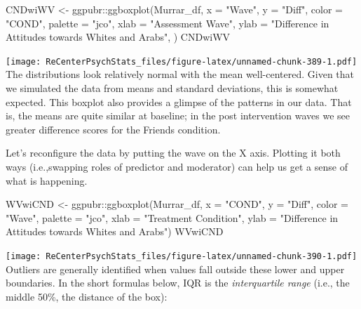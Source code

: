 \documentclass[
  11pt,
]{book}
\newenvironment{Shaded}{\begin{snugshade}}{\end{snugshade}}
\newcommand{\AttributeTok}[1]{\textcolor[rgb]{0.77,0.63,0.00}{#1}}
\newcommand{\FunctionTok}[1]{\textcolor[rgb]{0.00,0.00,0.00}{#1}}
\newcommand{\NormalTok}[1]{#1}
\newcommand{\OtherTok}[1]{\textcolor[rgb]{0.56,0.35,0.01}{#1}}
\newcommand{\SpecialCharTok}[1]{\textcolor[rgb]{0.00,0.00,0.00}{#1}}
\newcommand{\StringTok}[1]{\textcolor[rgb]{0.31,0.60,0.02}{#1}}
\begin{document}
\begin{Shaded}
\begin{Highlighting}[]
\NormalTok{CNDwiWV }\OtherTok{\textless{}{-}}\NormalTok{ ggpubr}\SpecialCharTok{::}\FunctionTok{ggboxplot}\NormalTok{(Murrar\_df, }\AttributeTok{x =} \StringTok{"Wave"}\NormalTok{, }\AttributeTok{y =} \StringTok{"Diff"}\NormalTok{, }\AttributeTok{color =} \StringTok{"COND"}\NormalTok{,}
    \AttributeTok{palette =} \StringTok{"jco"}\NormalTok{, }\AttributeTok{xlab =} \StringTok{"Assessment Wave"}\NormalTok{, }\AttributeTok{ylab =} \StringTok{"Difference in Attitudes towards Whites and Arabs"}\NormalTok{,}
\NormalTok{    )}
\NormalTok{CNDwiWV}
\end{Highlighting}
\end{Shaded}

\texttt{[image: ReCenterPsychStats\_files/figure-latex/unnamed-chunk-389-1.pdf]}
The distributions look relatively normal with the mean well-centered. Given that we simulated the data from means and standard deviations, this is somewhat expected. This boxplot also provides a glimpse of the patterns in our data. That is, the means are quite similar at baseline; in the post intervention waves we see greater difference scores for the Friends condition.

Let's reconfigure the data by putting the wave on the X axis. Plotting it both ways (i.e.,swapping roles of predictor and moderator) can help us get a sense of what is happening.

\begin{Shaded}
\begin{Highlighting}[]
\NormalTok{WVwiCND }\OtherTok{\textless{}{-}}\NormalTok{ ggpubr}\SpecialCharTok{::}\FunctionTok{ggboxplot}\NormalTok{(Murrar\_df, }\AttributeTok{x =} \StringTok{"COND"}\NormalTok{, }\AttributeTok{y =} \StringTok{"Diff"}\NormalTok{, }\AttributeTok{color =} \StringTok{"Wave"}\NormalTok{,}
    \AttributeTok{palette =} \StringTok{"jco"}\NormalTok{, }\AttributeTok{xlab =} \StringTok{"Treatment Condition"}\NormalTok{, }\AttributeTok{ylab =} \StringTok{"Difference in Attitudes towards Whites and Arabs"}\NormalTok{)}
\NormalTok{WVwiCND}
\end{Highlighting}
\end{Shaded}

\texttt{[image: ReCenterPsychStats\_files/figure-latex/unnamed-chunk-390-1.pdf]}
Outliers are generally identified when values fall outside these lower and upper boundaries. In the short formulas below, IQR is the \emph{interquartile range} (i.e., the middle 50\%, the distance of the box):
\end{document}
